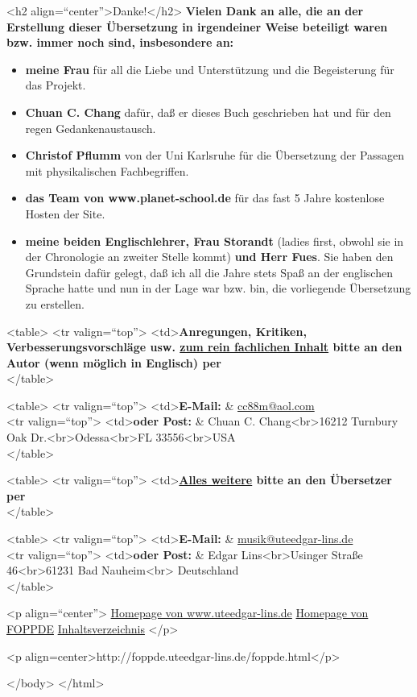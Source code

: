 


\label{Danke}

<h2 align=\enquote{center}>Danke!</h2>
\textbf{Vielen Dank an alle, die an der Erstellung dieser Übersetzung in irgendeiner Weise beteiligt waren bzw. immer noch sind, insbesondere an:}


\begin{itemize} 
 \item \textbf{meine Frau} für all die Liebe und Unterstützung und die Begeisterung für das Projekt.
 \item \textbf{Chuan C. Chang} dafür, daß er dieses Buch geschrieben hat und für den regen Gedankenaustausch.
 \item \textbf{Christof Pflumm} von der Uni Karlsruhe für die Übersetzung der Passagen mit physikalischen Fachbegriffen.
 \item \textbf{das Team von www.planet-school.de} für das fast 5 Jahre kostenlose Hosten der Site.
 \item \textbf{meine beiden Englischlehrer, Frau Storandt} (ladies first, obwohl sie in der Chronologie an zweiter Stelle kommt) \textbf{und Herr Fues}.
Sie haben den Grundstein dafür gelegt, daß ich all die Jahre stets Spaß an der englischen Sprache hatte und nun in der Lage war bzw. bin, die vorliegende Übersetzung zu erstellen.
 \end{itemize}






\label{kontakt}

<table>
 <tr valign=\enquote{top}>
  <td>\textbf{Anregungen, Kritiken, Verbesserungsvorschläge usw. \underline{zum rein fachlichen Inhalt} bitte an den Autor (wenn möglich in Englisch) per}
   \\ 
</table>

<table>
 <tr valign=\enquote{top}>
  <td>\textbf{E-Mail:} & \hyperref[mailto:cc88m@aol.com?subject=foppde]{cc88m@aol.com} \\ 
 <tr valign=\enquote{top}>
  <td>\textbf{oder Post:} & Chuan C. Chang<br>16212 Turnbury Oak Dr.<br>Odessa<br>FL 33556<br>USA \\ 
</table>

\label{mailel}

<table>
 <tr valign=\enquote{top}>
  <td>\textbf{\underline{Alles weitere} bitte an den Übersetzer per} \\ 
</table>

<table>
 <tr valign=\enquote{top}>
  <td>\textbf{E-Mail:} & \hyperref[mailto:musik@uteedgar-lins.de?subject=foppde]{musik@uteedgar-lins.de} \\ 
 <tr valign=\enquote{top}>
  <td>\textbf{oder Post:} & Edgar Lins<br>Usinger Straße 46<br>61231 Bad Nauheim<br>
Deutschland \\ 
</table>



<p align=\enquote{center}>
\hyperref[http://www.uteedgar-lins.de/index.html]{Homepage von www.uteedgar-lins.de} 
\hyperref[./index.html]{Homepage von FOPPDE} 
\hyperref[Inhalt]{Inhaltsverzeichnis} 
</p>

<p align=center>http://foppde.uteedgar-lins.de/foppde.html</p>

</body>
</html>
